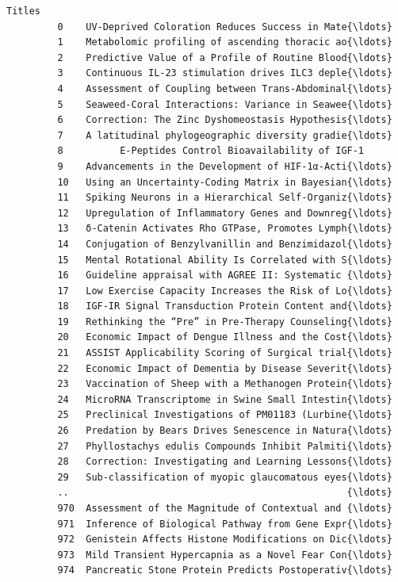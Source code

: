 \documentclass[11pt]{article}
\begin{document}
\begin{Verbatim}[commandchars=\\\{\}]
                                                         Titles  
         0    UV-Deprived Coloration Reduces Success in Mate{\ldots}  
         1    Metabolomic profiling of ascending thoracic ao{\ldots}  
         2    Predictive Value of a Profile of Routine Blood{\ldots}  
         3    Continuous IL-23 stimulation drives ILC3 deple{\ldots}  
         4    Assessment of Coupling between Trans-Abdominal{\ldots}  
         5    Seaweed-Coral Interactions: Variance in Seawee{\ldots}  
         6    Correction: The Zinc Dyshomeostasis Hypothesis{\ldots}  
         7    A latitudinal phylogeographic diversity gradie{\ldots}  
         8          E-Peptides Control Bioavailability of IGF-1  
         9    Advancements in the Development of HIF-1α-Acti{\ldots}  
         10   Using an Uncertainty-Coding Matrix in Bayesian{\ldots}  
         11   Spiking Neurons in a Hierarchical Self-Organiz{\ldots}  
         12   Upregulation of Inflammatory Genes and Downreg{\ldots}  
         13   δ-Catenin Activates Rho GTPase, Promotes Lymph{\ldots}  
         14   Conjugation of Benzylvanillin and Benzimidazol{\ldots}  
         15   Mental Rotational Ability Is Correlated with S{\ldots}  
         16   Guideline appraisal with AGREE II: Systematic {\ldots}  
         17   Low Exercise Capacity Increases the Risk of Lo{\ldots}  
         18   IGF-IR Signal Transduction Protein Content and{\ldots}  
         19   Rethinking the “Pre” in Pre-Therapy Counseling{\ldots}  
         20   Economic Impact of Dengue Illness and the Cost{\ldots}  
         21   ASSIST Applicability Scoring of Surgical trial{\ldots}  
         22   Economic Impact of Dementia by Disease Severit{\ldots}  
         23   Vaccination of Sheep with a Methanogen Protein{\ldots}  
         24   MicroRNA Transcriptome in Swine Small Intestin{\ldots}  
         25   Preclinical Investigations of PM01183 (Lurbine{\ldots}  
         26   Predation by Bears Drives Senescence in Natura{\ldots}  
         27   Phyllostachys edulis Compounds Inhibit Palmiti{\ldots}  
         28   Correction: Investigating and Learning Lessons{\ldots}  
         29   Sub-classification of myopic glaucomatous eyes{\ldots}  
         ..                                                 {\ldots}  
         970  Assessment of the Magnitude of Contextual and {\ldots}  
         971  Inference of Biological Pathway from Gene Expr{\ldots}  
         972  Genistein Affects Histone Modifications on Dic{\ldots}  
         973  Mild Transient Hypercapnia as a Novel Fear Con{\ldots}  
         974  Pancreatic Stone Protein Predicts Postoperativ{\ldots}  

\end{Verbatim}
\end{document}
